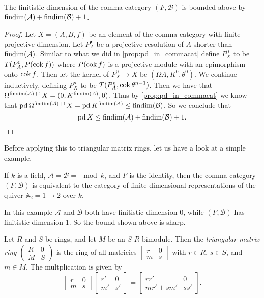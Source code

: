 \begin{theorem}\cite[Theorem~4.20]{FGR75}\label{thm:findim_of_comma_cat}
	The finitistic dimension of the comma category $(F, \mathcal B)$ is bounded above by $\operatorname{findim}(\mathcal A) + \operatorname{findim}(\mathcal B) + 1$.
	\begin{proof}
		Let $X=(A, B, f)$ be an element of the comma category with finite projective dimension. Let $P_A^\bullet$ be a projective resolution of $A$ shorter than $\operatorname{findim}(\mathcal A)$. Similar to what we did in \cref{prop:pd_in_commacat} define $P_X^0$ to be $T(P_A^0, P(\operatorname{cok} f))$ where $P(\operatorname{cok} f)$ is a projective module with an epimorphism onto $\operatorname{cok} f$. Then let the kernel of $P_X^0 \to X$ be $(\Omega A, K^0, \theta^0)$. We continue inductively, defining $P_X^n$ to be $T(P_A^n, \operatorname{cok} \theta^{n-1})$. Then we have that $\Omega^{\operatorname{findim}(\mathcal A)+1} X = (0, K^{\operatorname{findim}(\mathcal A)}, 0)$. Thus by \cref{prop:pd_in_commacat} we know that $\operatorname{pd}\Omega^{\operatorname{findim}(\mathcal A)+1}X = \operatorname{pd} K^{\operatorname{findim}(\mathcal A)} \leq \operatorname{findim}(\mathcal B)$. So we conclude that $$\operatorname{pd} X \leq \operatorname{findim}(\mathcal A) + \operatorname{findim}(\mathcal B) + 1.$$
	\end{proof}
\end{theorem}

Before applying this to triangular matrix rings, let us have a look at a simple example.

\begin{example}\label{ex:triangular_matrix_ring}
	If $k$ is a field, $\mathcal A = \mathcal B = \mod k$, and $F$ is the identity, then the comma category $(F, \mathcal B)$ is equivalent to the category of finite dimensional representations of the quiver $\mathbb A_2 = 1 \to 2$ over $k$. 
\end{example}

In this example $\mathcal A$ and $\mathcal B$ both have finitistic dimension 0, while $(F, \mathcal B)$ has finitistic dimension 1. So the bound shown above is sharp. 

\begin{defn}
	Let $R$ and $S$ be rings, and let $M$ be an $S$-$R$-bimodule. Then the \emph{triangular matrix ring} $\begin{pmatrix}
	R & 0\\
	M & S
	\end{pmatrix}$ is the ring of all matricies $\begin{bmatrix}
	r & 0\\
	m & s
	\end{bmatrix}$ with $r\in R$, $s\in S$, and $m\in M$. The multplication is given by
	$$\begin{bmatrix}
	r & 0\\
	m & s
	\end{bmatrix}\begin{bmatrix}
	r' & 0\\
	m' & s'
	\end{bmatrix}=\begin{bmatrix}
	rr' & 0\\
	mr' + sm' & ss'
	\end{bmatrix}.$$
\end{defn}

